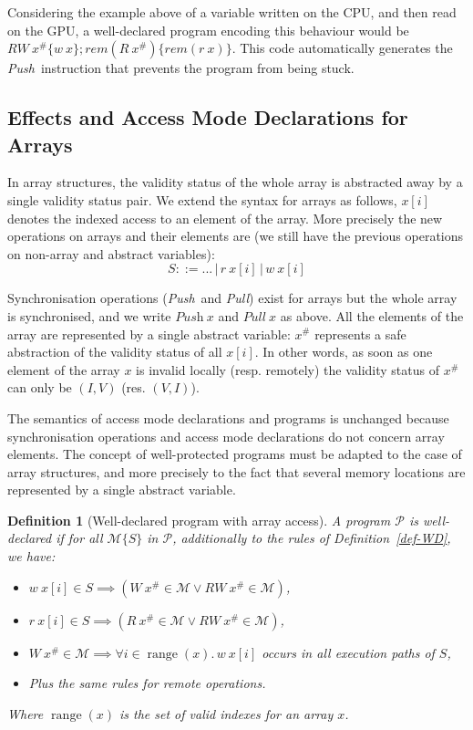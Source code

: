 \documentclass[preprint,12pt]{elsarticle}
\newcommand{\symb}[1]{\textit{#1}}
\newcommand{\Push}{\symb{Push}}
\newcommand{\Pull}{\symb{Pull}}
\newcommand{\rem}[1]{\symb{rem}(#1)}
\newtheorem{definition}{Definition}
\newcommand{\abs}[1]{#1^\#}
\newcommand{\AM}{\mathcal{M}}
\newcommand{\Prog}{\mathcal{P}}
\DeclareMathOperator{\range}{range}
\begin{document}
Considering the example above of a variable written on the CPU, and then read on the GPU, 
a well-declared program encoding this behaviour would be  $RW~\abs x\{w~x\};\rem{R~\abs 
x}\{\rem{r~x}\}$. This code automatically generates the \Push\ instruction that prevents 
the program from being stuck.
\subsection{Effects and Access Mode Declarations for Arrays}\label{sec-arrays}
In array structures, the 
validity status of the whole array is abstracted away by a single validity status pair. 
We extend the syntax for arrays as follows, $x[i]$ denotes the indexed access to an 
element of the array. More precisely the new operations on arrays and their elements are 
(we still have the previous operations on non-array and abstract variables):
\[S::= ... \,|\, r~x[i] \,|\, w~x[i] \]

Synchronisation operations (\Push\ and \Pull) exist for arrays but the whole array is 
synchronised, and we write $\Push~x$ and $\Pull~x$ as above.
All the elements of the array are represented by a single abstract variable: $\abs{x}$ 
represents a safe abstraction of the validity status of all $x[i]$. In other words, as soon as one element of the array $x$ is invalid locally (resp. remotely) the validity status of $\abs x$ can only be $(I,V)$ (res. $(V,I)$).

The semantics of access mode declarations and programs is unchanged because 
synchronisation operations and access mode declarations do not concern array elements.
The concept of well-protected programs must be adapted to the case of array structures, 
and more 
precisely to the fact that several  memory locations are represented by a single abstract 
variable.


\begin{definition}[Well-declared program with array access]\label{def:well-declared-array}
A program $\Prog$ is \emph{well-declared} if for all $\AM\{S\}$ in $\Prog$, additionally 
to the rules of Definition~\ref{def-WD}, we have:
\begin{itemize}
\item $w\ x[i]\in S \implies (W\ \abs x \in \AM \lor RW\ \abs x \in \AM)$,
\item $r\ x[i]\in S \implies (R\ \abs x \in \AM \lor RW\ \abs x \in \AM)$,
\item $W\ \abs x\!\in\! \AM \!\implies\! \forall i\!\!\in\!\!\range(x).\, w\ x[i]$ occurs in all execution 
paths of $S$,
\item Plus the same rules for remote operations.
\end{itemize}
Where $\range(x)$ is the set of valid 
 indexes for an array $x$.
\end{definition}
\end{document}
